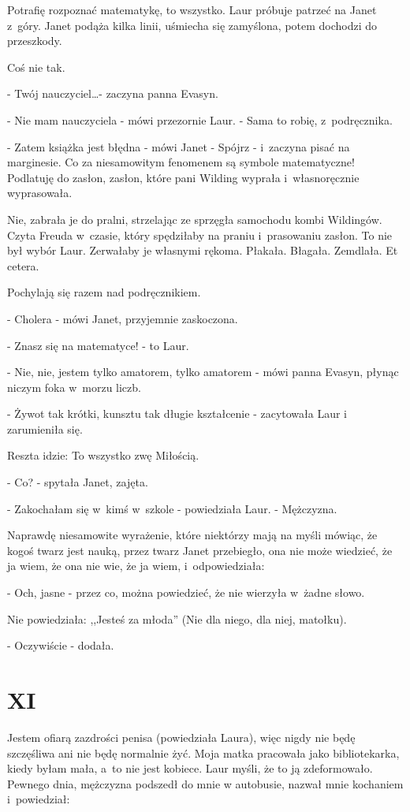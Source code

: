 \documentclass[oneside,polish,12pt,sfheadings]{mwbk}
\begin{document}
Potrafię rozpoznać matematykę, to wszystko. Laur próbuje patrzeć na
Janet z~góry. Janet podąża kilka linii, uśmiecha się zamyślona, potem
dochodzi do przeszkody.

Coś nie tak. 

- Twój nauczyciel\ldots - zaczyna panna Evasyn.

- Nie mam nauczyciela - mówi przezornie Laur. - Sama to robię, z~podręcznika.

- Zatem książka jest błędna - mówi Janet - Spójrz - i~zaczyna pisać
na marginesie. Co za niesamowitym fenomenem są symbole matematyczne!
Podlatuję do zasłon, zasłon, które pani Wilding wyprała i~własnoręcznie
wyprasowała.

Nie, zabrała je do pralni, strzelając ze sprzęgła samochodu kombi
Wildingów. Czyta Freuda w~czasie, który spędziłaby na praniu i~prasowaniu
zasłon. To nie był wybór Laur. Zerwałaby je własnymi rękoma. Płakała.
Błagała. Zemdlała. Et cetera.

Pochylają się razem nad podręcznikiem.

- Cholera - mówi Janet, przyjemnie zaskoczona.

- Znasz się na matematyce! - to Laur.

- Nie, nie, jestem tylko amatorem, tylko amatorem - mówi panna Evasyn,
płynąc niczym foka w~morzu liczb.

- Żywot tak krótki, kunsztu tak długie kształcenie - zacytowała Laur
i zarumieniła się.

Reszta idzie: To wszystko zwę Miłością.

- Co? - spytała Janet, zajęta.

- Zakochałam się w~kimś w~szkole - powiedziała Laur. - Mężczyzna.

Naprawdę niesamowite wyrażenie, które niektórzy mają na myśli mówiąc,
że kogoś twarz jest nauką, przez twarz Janet przebiegło, ona nie może
wiedzieć, że ja wiem, że ona nie wie, że ja wiem, i~odpowiedziała:

- Och, jasne - przez co, można powiedzieć, że nie wierzyła w~żadne słowo.

Nie powiedziała: ,,Jesteś za młoda'' (Nie dla niego, dla niej, matołku).

- Oczywiście - dodała.

\chapter{XI}

Jestem ofiarą zazdrości penisa (powiedziała Laura), więc nigdy nie
będę szczęśliwa ani nie będę normalnie żyć. Moja matka pracowała jako
bibliotekarka, kiedy byłam mała, a~to nie jest kobiece. Laur myśli,
że to ją zdeformowało. Pewnego dnia, mężczyzna podszedł do mnie w
autobusie, nazwał mnie kochaniem i~powiedział: 
\end{document}
